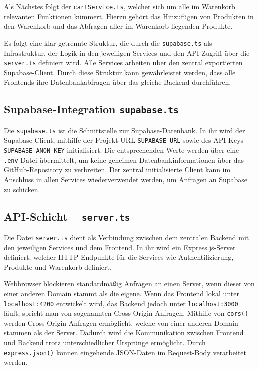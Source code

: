\documentclass[oneside]{ausarbeitung}
\begin{document}
Als Nächstes folgt der \texttt{cartService.ts}, welcher sich um alle im Warenkorb relevanten Funktionen kümmert. Hierzu gehört das Hinzufügen von Produkten in den Warenkorb und das Abfragen aller im Warenkorb liegenden Produkte.

Es folgt eine klar getrennte Struktur, die durch die \texttt{supabase.ts} als Infrastruktur, der Logik in den jeweiligen Services und den API-Zugriff über die \texttt{server.ts} definiert wird. Alle Services arbeiten über den zentral exportierten Supabase-Client. Durch diese Struktur kann gewährleistet werden, dass alle Frontends ihre Datenbankabfragen über das gleiche Backend durchführen.

\subsection{Supabase-Integration \texttt{supabase.ts}}

Die \texttt{supabase.ts} ist die Schnittstelle zur Supabase-Datenbank. In ihr wird der Supabase-Client, mithilfe der Projekt-URL \texttt{SUPABASE\_URL} sowie des API-Keys \texttt{SUPABASE\_ANON\_KEY} initialisiert. Die entsprechenden Werte werden über eine \texttt{.env}-Datei übermittelt, um keine geheimen Datenbankinformationen über das GitHub-Repository zu verbreiten. Der zentral initialisierte Client kann im Anschluss in allen Services wiederverwendet werden, um Anfragen an Supabase zu schicken.

\subsection{API-Schicht – \texttt{server.ts}}

Die Datei \texttt{server.ts} dient als Verbindung zwischen dem zentralen Backend mit den jeweiligen Services und dem Frontend. In ihr wird ein Express.js-Server definiert, welcher \ac{HTTP}-Endpunkte für die Services wie Authentifizierung, Produkte und Warenkorb definiert.

Webbrowser blockieren standardmäßig Anfragen an einen Server, wenn dieser von einer anderen Domain stammt als die eigene. Wenn das Frontend lokal unter \texttt{localhost:4200} entwickelt wird, das Backend jedoch unter \texttt{localhost:3000} läuft, spricht man von sogenannten Cross-Origin-Anfragen.
Mithilfe von \texttt{cors()} werden Cross-Origin-Anfragen ermöglicht, welche von einer anderen Domain stammen als der Server. Dadurch wird die Kommunikation zwischen Frontend und Backend trotz unterschiedlicher Ursprünge ermöglicht.
Durch \texttt{express.json()} können eingehende JSON-Daten im Request-Body verarbeitet werden.
\end{document}
